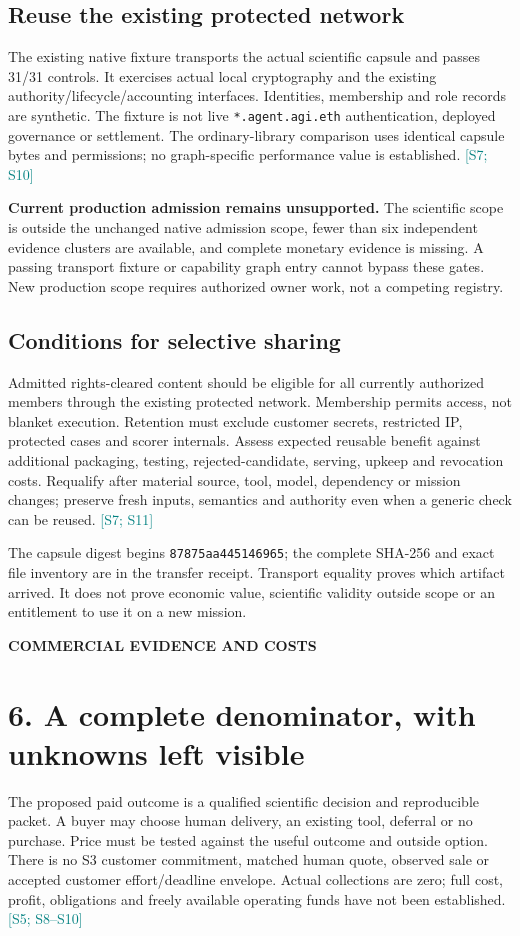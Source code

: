 \documentclass[10pt,letterpaper]{article}
\newcommand{\src}[1]{\textcolor{Teal}{\scriptsize[#1]}}
\newcommand{\keybox}[1]{\par\smallskip\noindent\begingroup\setlength{\fboxsep}{9pt}\colorbox{Pale}{\parbox{\dimexpr\linewidth-18pt\relax}{#1}}\endgroup\par\smallskip}
\newcommand{\eyebrow}[1]{{\small\bfseries\color{Gold}\MakeUppercase{#1}}\par}
\newcommand{\pagename}[2]{\eyebrow{#1}\section*{#2}}
\begin{document}
\subsection*{Reuse the existing protected network}
The existing native fixture transports the actual scientific capsule and passes 31/31 controls. It exercises actual local cryptography and the existing authority/lifecycle/accounting interfaces. Identities, membership and role records are synthetic. The fixture is not live \texttt{*.agent.agi.eth} authentication, deployed governance or settlement. The ordinary-library comparison uses identical capsule bytes and permissions; no graph-specific performance value is established. \src{S7; S10}

\keybox{\textbf{Current production admission remains unsupported.} The scientific scope is outside the unchanged native admission scope, fewer than six independent evidence clusters are available, and complete monetary evidence is missing. A passing transport fixture or capability graph entry cannot bypass these gates. New production scope requires authorized owner work, not a competing registry.}

\subsection*{Conditions for selective sharing}
Admitted rights-cleared content should be eligible for all currently authorized members through the existing protected network. Membership permits access, not blanket execution. Retention must exclude customer secrets, restricted IP, protected cases and scorer internals. Assess expected reusable benefit against additional packaging, testing, rejected-candidate, serving, upkeep and revocation costs. Requalify after material source, tool, model, dependency or mission changes; preserve fresh inputs, semantics and authority even when a generic check can be reused. \src{S7; S11}

The capsule digest begins \texttt{87875aa445146965}; the complete SHA-256 and exact file inventory are in the transfer receipt. Transport equality proves which artifact arrived. It does not prove economic value, scientific validity outside scope or an entitlement to use it on a new mission.

\newpage
\pagename{Commercial evidence and costs}{6. A complete denominator, with unknowns left visible}
The proposed paid outcome is a qualified scientific decision and reproducible packet. A buyer may choose human delivery, an existing tool, deferral or no purchase. Price must be tested against the useful outcome and outside option. There is no S3 customer commitment, matched human quote, observed sale or accepted customer effort/deadline envelope. Actual collections are zero; full cost, profit, obligations and freely available operating funds have not been established. \src{S5; S8--S10}
\end{document}
